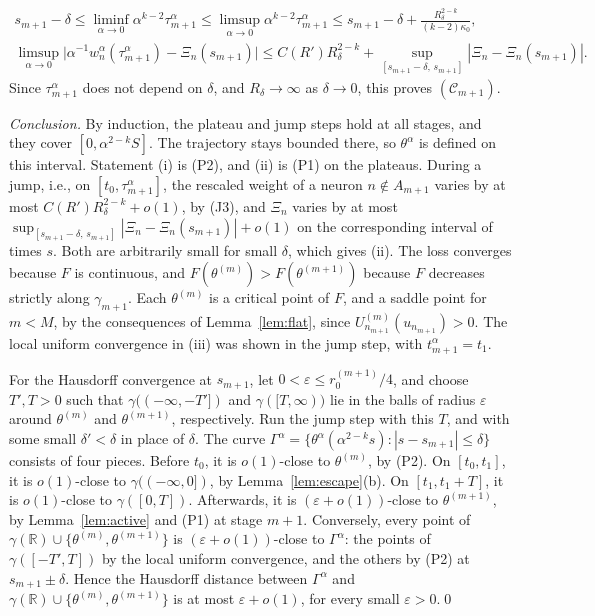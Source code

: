 \documentclass[11pt]{article}
\theoremstyle{definition}
\theoremstyle{remark}
\newcommand{\R}{\mathbb{R}}
\newcommand{\eps}{\varepsilon}
\begin{document}
\begin{gather*}
s_{m+1}-\delta\le\liminf_{\alpha\to0}\alpha^{k-2}\tau^\alpha_{m+1}\le\limsup_{\alpha\to0}\alpha^{k-2}\tau^\alpha_{m+1}\le s_{m+1}-\delta+\frac{R_\delta^{2-k}}{(k-2)\kappa_0},\\
\limsup_{\alpha\to0}\big|\alpha^{-1}w^\alpha_n(\tau^\alpha_{m+1})-\Xi_n(s_{m+1})\big|\le C(R')R_\delta^{2-k}+\sup_{[s_{m+1}-\delta,\,s_{m+1}]}|\Xi_n-\Xi_n(s_{m+1})| .
\end{gather*}
Since $\tau^\alpha_{m+1}$ does not depend on $\delta$, and $R_\delta\to\infty$ as $\delta\to0$, this proves $(\mathcal C_{m+1})$.

\emph{Conclusion.} By induction, the plateau and jump steps hold at all stages, and they cover $[0,\alpha^{2-k}S]$. The trajectory stays bounded there, so $\theta^\alpha$ is defined on this interval. Statement (i) is (P2), and (ii) is (P1) on the plateaus. During a jump, i.e., on $[t_0,\tau^\alpha_{m+1}]$, the rescaled weight of a neuron $n\notin A_{m+1}$ varies by at most $C(R')R_\delta^{2-k}+o(1)$, by (J3), and $\Xi_n$ varies by at most $\sup_{[s_{m+1}-\delta,\,s_{m+1}]}|\Xi_n-\Xi_n(s_{m+1})|+o(1)$ on the corresponding interval of times $s$. Both are arbitrarily small for small $\delta$, which gives (ii). The loss converges because $F$ is continuous, and $F(\theta^{(m)})>F(\theta^{(m+1)})$ because $F$ decreases strictly along $\gamma_{m+1}$. Each $\theta^{(m)}$ is a critical point of $F$, and a saddle point for $m<M$, by the consequences of Lemma~\ref{lem:flat}, since $U^{(m)}_{n_{m+1}}(u_{n_{m+1}})>0$. The local uniform convergence in (iii) was shown in the jump step, with $t^\alpha_{m+1}=t_1$.

For the Hausdorff convergence at $s_{m+1}$, let $0<\eps\le r^{(m+1)}_0/4$, and choose $T',T>0$ such that $\gamma((-\infty,-T'])$ and $\gamma([T,\infty))$ lie in the balls of radius $\eps$ around $\theta^{(m)}$ and $\theta^{(m+1)}$, respectively. Run the jump step with this $T$, and with some small $\delta'<\delta$ in place of $\delta$. The curve $\Gamma^\alpha=\{\theta^\alpha(\alpha^{2-k}s):|s-s_{m+1}|\le\delta\}$ consists of four pieces. Before $t_0$, it is $o(1)$-close to $\theta^{(m)}$, by (P2). On $[t_0,t_1]$, it is $o(1)$-close to $\gamma((-\infty,0])$, by Lemma~\ref{lem:escape}(b). On $[t_1,t_1+T]$, it is $o(1)$-close to $\gamma([0,T])$. Afterwards, it is $(\eps+o(1))$-close to $\theta^{(m+1)}$, by Lemma~\ref{lem:active} and (P1) at stage $m+1$. Conversely, every point of $\gamma(\R)\cup\{\theta^{(m)},\theta^{(m+1)}\}$ is $(\eps+o(1))$-close to $\Gamma^\alpha$: the points of $\gamma([-T',T])$ by the local uniform convergence, and the others by (P2) at $s_{m+1}\pm\delta$. Hence the Hausdorff distance between $\Gamma^\alpha$ and $\gamma(\R)\cup\{\theta^{(m)},\theta^{(m+1)}\}$ is at most $\eps+o(1)$, for every small $\eps>0$.\qed
\end{document}
